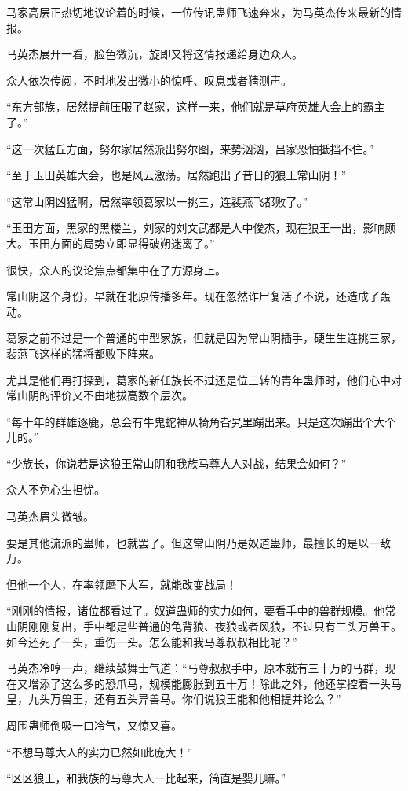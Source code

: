 \begin{this_body}
马家高层正热切地议论着的时候，一位传讯蛊师飞速奔来，为马英杰传来最新的情报。

马英杰展开一看，脸色微沉，旋即又将这情报递给身边众人。

众人依次传阅，不时地发出微小的惊呼、叹息或者猜测声。

“东方部族，居然提前压服了赵家，这样一来，他们就是草府英雄大会上的霸主了。”

“这一次猛丘方面，努尔家居然派出努尔图，来势汹汹，吕家恐怕抵挡不住。”

“至于玉田英雄大会，也是风云激荡。居然跑出了昔日的狼王常山阴！”

“这常山阴凶猛啊，居然率领葛家以一挑三，连裴燕飞都败了。”

“玉田方面，黑家的黑楼兰，刘家的刘文武都是人中俊杰，现在狼王一出，影响颇大。玉田方面的局势立即显得破朔迷离了。”

很快，众人的议论焦点都集中在了方源身上。

常山阴这个身份，早就在北原传播多年。现在忽然诈尸复活了不说，还造成了轰动。

葛家之前不过是一个普通的中型家族，但就是因为常山阴插手，硬生生连挑三家，裴燕飞这样的猛将都败下阵来。

尤其是他们再打探到，葛家的新任族长不过还是位三转的青年蛊师时，他们心中对常山阴的评价又不由地拔高数个层次。

“每十年的群雄逐鹿，总会有牛鬼蛇神从犄角旮旯里蹦出来。只是这次蹦出个大个儿的。”

“少族长，你说若是这狼王常山阴和我族马尊大人对战，结果会如何？”

众人不免心生担忧。

马英杰眉头微皱。

要是其他流派的蛊师，也就罢了。但这常山阴乃是奴道蛊师，最擅长的是以一敌万。

但他一个人，在率领麾下大军，就能改变战局！

“刚刚的情报，诸位都看过了。奴道蛊师的实力如何，要看手中的兽群规模。他常山阴刚刚复出，手中都是些普通的龟背狼、夜狼或者风狼，不过只有三头万兽王。如今还死了一头，重伤一头。怎么能和我马尊叔叔相比呢？”

马英杰冷哼一声，继续鼓舞士气道：“马尊叔叔手中，原本就有三十万的马群，现在又增添了这么多的恐爪马，规模能膨胀到五十万！除此之外，他还掌控着一头马皇，九头万兽王，还有五头异兽马。你们说狼王能和他相提并论么？”

周围蛊师倒吸一口冷气，又惊又喜。

“不想马尊大人的实力已然如此庞大！”

“区区狼王，和我族的马尊大人一比起来，简直是婴儿嘛。”


\end{this_body}
